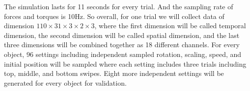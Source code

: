 The simulation lasts for 11 seconds for every trial. And the sampling rate of forces and torques is 10Hz. So overall, for one trial we will collect data of dimension $110 \times 31 \times 3 \times 2 \times 3$, where the first dimension will be called temporal dimension, the second dimension will be called spatial dimension, and the last three dimensions will be combined together as 18 different channels.
For every object, 96 settings including independent sampled rotation, scaling, speed, and initial position will be sampled where each setting includes three trials including top, middle, and bottom swipes. Eight more independent settings will be generated for every object for validation.
